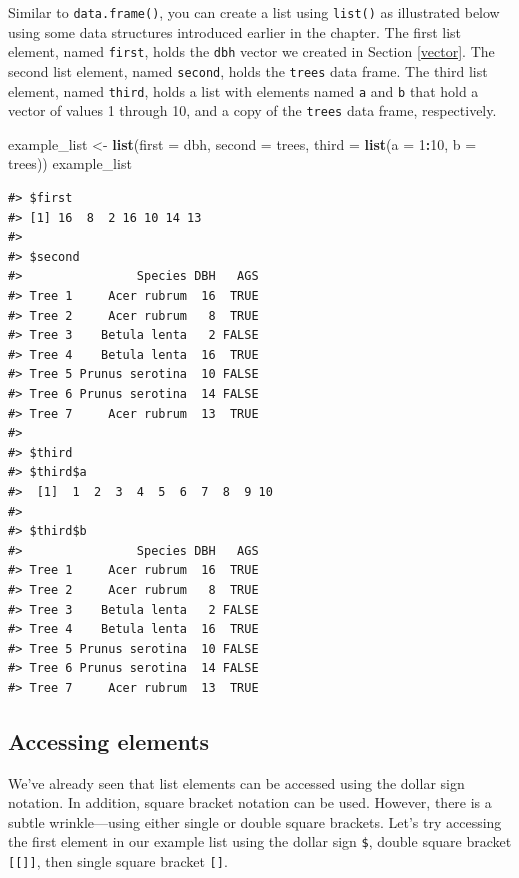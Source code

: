 \documentclass[
  11pt,
]{krantz}
\newenvironment{Shaded}{\begin{snugshade}}{\end{snugshade}}
\newcommand{\DataTypeTok}[1]{\textcolor[rgb]{0.13,0.29,0.53}{#1}}
\newcommand{\DecValTok}[1]{\textcolor[rgb]{0.00,0.00,0.81}{#1}}
\newcommand{\KeywordTok}[1]{\textcolor[rgb]{0.13,0.29,0.53}{\textbf{#1}}}
\newcommand{\NormalTok}[1]{#1}
\newcommand{\OperatorTok}[1]{\textcolor[rgb]{0.81,0.36,0.00}{\textbf{#1}}}
\newcommand{\StringTok}[1]{\textcolor[rgb]{0.31,0.60,0.02}{#1}}
\theoremstyle{definition}
\theoremstyle{definition}
\theoremstyle{definition}
\theoremstyle{definition}
\theoremstyle{remark}
\begin{document}
Similar to \texttt{data.frame()}, you can create a list using \texttt{list()} as illustrated below using some data structures introduced earlier in the chapter. The first list element, named \texttt{first}, holds the \texttt{dbh} vector we created in Section \ref{vector}. The second list element, named \texttt{second}, holds the \texttt{trees} data frame. The third list element, named \texttt{third}, holds a list with elements named \texttt{a} and \texttt{b} that hold a vector of values 1 through 10, and a copy of the \texttt{trees} data frame, respectively.

\begin{Shaded}
\begin{Highlighting}[]
\NormalTok{example\_list \textless{}{-}}\StringTok{ }\KeywordTok{list}\NormalTok{(}\DataTypeTok{first =}\NormalTok{ dbh, }\DataTypeTok{second =}\NormalTok{ trees,}
                     \DataTypeTok{third =} \KeywordTok{list}\NormalTok{(}\DataTypeTok{a =} \DecValTok{1}\OperatorTok{:}\DecValTok{10}\NormalTok{, }\DataTypeTok{b =}\NormalTok{ trees))}
\NormalTok{example\_list}
\end{Highlighting}
\end{Shaded}

\begin{verbatim}
#> $first
#> [1] 16  8  2 16 10 14 13
#> 
#> $second
#>                Species DBH   AGS
#> Tree 1     Acer rubrum  16  TRUE
#> Tree 2     Acer rubrum   8  TRUE
#> Tree 3    Betula lenta   2 FALSE
#> Tree 4    Betula lenta  16  TRUE
#> Tree 5 Prunus serotina  10 FALSE
#> Tree 6 Prunus serotina  14 FALSE
#> Tree 7     Acer rubrum  13  TRUE
#> 
#> $third
#> $third$a
#>  [1]  1  2  3  4  5  6  7  8  9 10
#> 
#> $third$b
#>                Species DBH   AGS
#> Tree 1     Acer rubrum  16  TRUE
#> Tree 2     Acer rubrum   8  TRUE
#> Tree 3    Betula lenta   2 FALSE
#> Tree 4    Betula lenta  16  TRUE
#> Tree 5 Prunus serotina  10 FALSE
#> Tree 6 Prunus serotina  14 FALSE
#> Tree 7     Acer rubrum  13  TRUE
\end{verbatim}

\hypertarget{accessing-elements}{%
\subsection{Accessing elements}\label{accessing-elements}}

We've already seen that list elements can be accessed using the dollar sign notation. In addition, square bracket notation can be used. However, there is a subtle wrinkle---using either single or double square brackets. Let's try accessing the first element in our example list using the dollar sign \texttt{\$}, double square bracket \texttt{{[}{[}{]}{]}}, then single square bracket \texttt{{[}{]}}.
\end{document}
